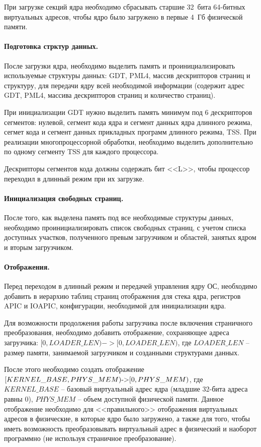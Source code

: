 При загрузке секций ядра необходимо сбрасывать старшие 32~бита 64-битных виртуальных адресов,
чтобы ядро было загружено в первые 4~Гб физической памяти.

\paragraph{Подготовка стрктур данных.} После загрузки ядра, необходимо выделить память и проинициализировать
используемые структуры данных: GDT, PML4, массив дескрипторов страниц и структуру, для передачи
ядру всей необходимой информации (содержит адрес GDT, PML4, массива дескрипторов страниц и количество страниц).

При инициализации GDT нужно выделить память минимум под 6 дескрипторов сегментов:
нулевой, сегмент кода ядра и сегмент данных ядра длинного режима, сегмет кода
и сегмент данных прикладных программ длинного режима, TSS. При реализации многопроцессорной
обработки, необходимо выделить дополнительно по одному сегменту TSS для каждого процессора.

Дескрипторы сегментов кода должны содержать бит <<L>>, чтобы процессор переходил в длинный
режим при их загрузке.

\paragraph{Инициализация свободных страниц.} После того, как выделена память под все
необходимые структуры данных, необходимо проинициализировать список свободных страниц,
с учетом списка доступных участков, полученного превым загрузчиком и областей,
занятых ядром и вторым загрузчиком.

\paragraph{Отображения.} Перед переходом в длинный режим и передачей управления ядру ОС,
необходимо добавить в иерархию таблиц страниц отображения для стека ядра, регистров APIC и IOAPIC,
конфигурации, необходимой для инициализации ядра.

Для возможности продолжения работы загрузчика после включения страничного преобразования,
необходимо добавить отображение, сохраняющее адреса загрузчика: $[0, LOADER\_LEN) -> [0, LOADER\_LEN)$,
где $LOADER\_LEN$ -- размер памяти, занимаемой загрузчиком и созданными структурами данных.

После этого необходимо создать отображение $[KERNEL\_BASE, PHYS\_MEM) \textup{->} [0, PHYS\_MEM)$,
где $KERNEL\_BASE$ -- базовый виртуальный адрес ядра (младшие 32-бита адреса равны 0), $PHYS\_MEM$ --
объем доступной физической памяти. Данное отображение необходимо для <<правильного>> отображения
виртуальных адресов в физические, в которые ядро было загружено, а также для того, чтобы иметь
возможность преобразовывать виртуальный адрес в физический и наоборот программно (не используя
страничное преобразование).

